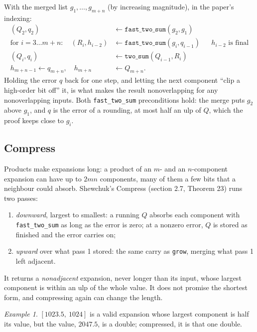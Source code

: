 \documentclass[11pt,a4paper]{article}
\newcommand{\code}[1]{\texttt{#1}}
\theoremstyle{definition}
\theoremstyle{remark}
\newtheorem*{example}{Example}
\begin{document}
With the merged list $g_1, \dots, g_{m+n}$ (by increasing magnitude), in the paper's indexing:
\begin{align*}
  (Q_2, q_2) &\leftarrow \code{fast\_two\_sum}(g_2, g_1)\\
  \text{for } i = 3 \dots m+n:\quad (R_i, h_{i-2}) &\leftarrow \code{fast\_two\_sum}(g_i, q_{i-1})
    && h_{i-2}\text{ is final}\\
  (Q_i, q_i) &\leftarrow \code{two\_sum}(Q_{i-1}, R_i)\\
  h_{m+n-1} \leftarrow q_{m+n},\quad h_{m+n} &\leftarrow Q_{m+n}.
\end{align*}
Holding the error $q$ back for one step, and letting the next component ``clip a high-order bit
off'' it, is what makes the result nonoverlapping for any nonoverlapping inputs. Both
\code{fast\_two\_sum} preconditions hold: the merge puts $g_2$ above $g_1$, and $q$ is the error
of a rounding, at most half an ulp of $Q$, which the proof keeps close to $g_i$.

\subsection{Compress}\label{ssec:compress}

Products make expansions long: a product of an $m$- and an $n$-component expansion can have up
to $2mn$ components, many of them a few bits that a neighbour could absorb. Shewchuk's Compress
(section 2.7, Theorem 23) runs two passes:
\begin{enumerate}
  \item \emph{downward}, largest to smallest: a running $Q$ absorbs each component with
    \code{fast\_two\_sum} as long as the error is zero; at a nonzero error, $Q$ is stored as
    finished and the error carries on;
  \item \emph{upward} over what pass 1 stored: the same carry as \code{grow}, merging what pass 1
    left adjacent.
\end{enumerate}
It returns a \emph{nonadjacent} expansion, never longer than its input, whose largest component
is within an ulp of the whole value. It does not promise the shortest form, and compressing
again can change the length.

\begin{example}
$[1023.5,\ 1024]$ is a valid expansion whose largest component is half its value, but the value,
$2047.5$, is a double; compressed, it is that one double.
\end{example}
\end{document}
